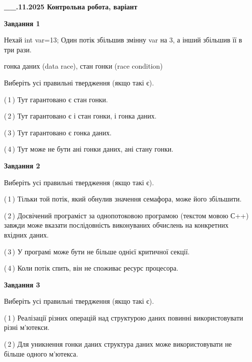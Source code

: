 \documentclass[12pt, ukrainian]{article}
\begin{document}
\begin {large}

\textbf{\_\_.11.2025 Контрольна робота, варіант  }\par


{

\begin{center}
\textbf{Завдання 1}
\end{center}
Нехай int var=13; Один потік збільшив змінну var на 3, а інший збільшив її в три рази.

гонка даних (data race), стан гонки (race condition)

Виберіть усі правильні твердження (якщо такі є).\par
\vspace{2mm}
(\,1\,) Тут гарантовано є стан гонки.%

(\,2\,) Тут гарантовано є і стан гонки, і гонка даних.%

(\,3\,) Тут гарантовано є гонка даних.%

(\,4\,) Тут може не бути ані гонки даних, ані стану гонки.%



\begin{center}
\textbf{Завдання 2}
\end{center}
Виберіть усі правильні твердження (якщо такі є).\par
\vspace{2mm}

(\,1\,) Тільки той потік, який обнулив значення семафора, може його збільшити.%

(\,2\,) Досвічений програміст за однопотоковою програмою (текстом мовою С++) завжди може вказати послідовність виконуваних обчислень на конкретних вхідних даних.%

(\,3\,) У програмі може бути не більше однієї критичної секції.%

(\,4\,) Коли потік спить, він не споживає ресурс процесора.%



\begin{center}
\textbf{Завдання 3}
\end{center}
Виберіть усі правильні твердження (якщо такі є).\par
\vspace{2mm}

(\,1\,) Реалізації різних операцій над структурою даних повинні використовувати різні м’ютекси.%

(\,2\,) Для уникнення гонки даних структура даних може використовувати не більше одного м’ютекса.%

}
\end{large}
\end{document}
